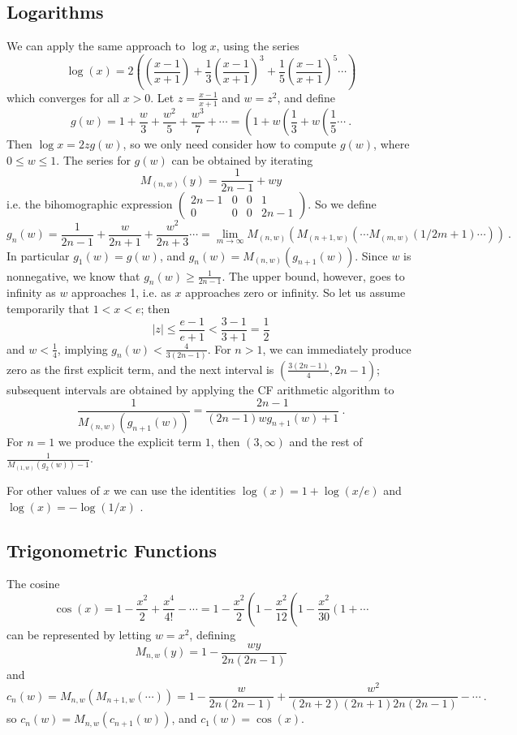 \documentclass[11pt, oneside]{amsart}   	%
\newcommand{\bihomographic}[8]{\left(\begin{smallmatrix}#1&#2&#3&#4\\#5&#6&#7&#8\end{smallmatrix}\right)}
\renewcommand{\:}{\negthickspace:\negthickspace}
\begin{document}
\subsection{Logarithms} We can apply the same approach to $\log x$, using the series
\[
\log (x) =  2 \left( \left(\frac{x-1}{x+1}\right) + \frac{1}{3}\left(\frac{x-1}{x+1}\right)^3 + \frac{1}{5}\left(\frac{x-1}{x+1}\right)^5 \cdots \right)
\]
which converges for all $x > 0$. Let $z=\frac{x-1}{x+1}$ and $w=z^2$, and define
\[
g(w) = 1 + \frac{w}{3} + \frac{w^2}{5} + \frac{w^3}{7} + \cdots = \left(1 + w\left(\frac{1}{3} + w\left(\frac{1}{5} \cdots \right. \right. \right. \ .
\]
Then $\log x = 2zg(w)$, so we only need consider how to compute $g(w)$, where $0 \leq w \leq 1$.
The series for $g(w)$ can be obtained by iterating
\[
M_{(n,w)}(y) = \frac{1}{2n-1} + wy 
\]
i.e. the bihomographic expression $\bihomographic{2n-1}{0}{0}{1}{0}{0}{0}{2n-1}$.
So we define
\[
g_n(w) = \frac{1}{2n-1}  + \frac{w}{2n+1} + \frac{w^2}{2n+3} \cdots = \lim_{m\to\infty} M_{(n,w)}( M_{(n+1,w)}( \cdots M_{(m,w)}(1/2m+1) \cdots ) ) \ .
\]
In particular $g_1(w) = g(w)$, and $g_n(w) = M_{(n,w)}(g_{n+1}(w))$. Since $w$ is nonnegative, we know that $g_n(w) \geq \frac{1}{2n-1}$.
The upper bound, however, goes to infinity as $w$ approaches 1, i.e. as $x$ approaches zero or infinity. So let us assume temporarily that $1<x<e$; then 
\[
|z| \leq \frac{e-1}{e+1} < \frac{3-1}{3+1} = \frac{1}{2}
\]
and $w < \frac{1}{4}$, implying $g_n(w) < \frac{4}{3(2n-1)}$.
For $n>1$, we can immediately produce zero as the first explicit term, and the next interval is $(\frac{3(2n-1)}{4}, 2n-1)$;
subsequent intervals are obtained by applying the CF arithmetic algorithm to
\[
\frac{1}{M_{(n,w)}(g_{n+1}(w))} = \frac{2n-1}{(2n-1)wg_{n+1}(w)+ 1} \ .
\]
For $n=1$ we produce the explicit term $1$, then  $(3,\infty)$ and the rest of  $\frac{1}{M_{(1,w)}(g_2(w))-1}$.

For other values of $x$  we can use the identities $\log(x)=1+\log(x/e)$ and $\log(x) = -\log(1/x)$ . 


\subsection{Trigonometric Functions}
The cosine
\[
\cos(x) = 1 - \frac{x^2}{2} + \frac{x^4}{4!} - \cdots = 1 - \frac{x^2}{2} \left(1 - \frac{x^2}{12}\left( 1 - \frac{x^2}{30}\left(1 + \cdots \right. \right.  \right.  
\]
can be represented by letting $w=x^2$, defining
\[
M_{n,w}(y) = 1 - \frac{wy}{2n(2n-1)}
\]
and
\begin{equation}\label{eq:cosIter}
c_n(w) = M_{n,w}(M_{n+1,w}(\cdots)) = 1 - \frac{w}{2n(2n-1)} + \frac{w^2}{(2n+2)(2n+1)2n(2n-1)} - \cdots \ .
\end{equation}
so $c_n(w) = M_{n,w}(c_{n+1}(w))$, and $c_1(w) = \cos(x)$.
\end{document}
